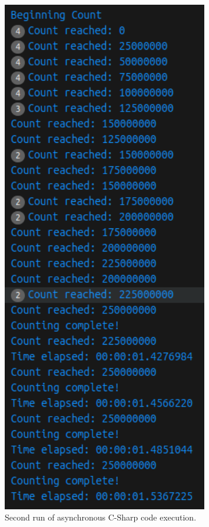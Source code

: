 \documentclass[12pt,a4paper]{article}
\begin{document}
\begin{figure}[htbp]
    \centering
    \includegraphics[width=0.8\textwidth]{../async_records/results_cs/result_2.png}
    \caption{Second run of asynchronous C-Sharp code execution.}
    \label{fig:C-Sharp-async-runtime-2}
\end{figure}
\end{document}
